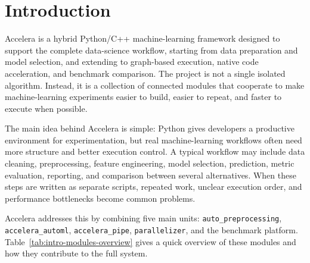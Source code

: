 \documentclass[12pt,a4paper]{report}
\begin{document}
\clearpage


\chapter{Introduction}
\label{chap:introduction}

Accelera is a hybrid Python/C++ machine-learning framework designed to support
the complete data-science workflow, starting from data preparation and model
selection, and extending to graph-based execution, native code acceleration, and
benchmark comparison. The project is not a single isolated algorithm. Instead,
it is a collection of connected modules that cooperate to make machine-learning
experiments easier to build, easier to repeat, and faster to execute when
possible.

The main idea behind Accelera is simple: Python gives developers a productive
environment for experimentation, but real machine-learning workflows often need
more structure and better execution control. A typical workflow may include data
cleaning, preprocessing, feature engineering, model selection, prediction,
metric evaluation, reporting, and comparison between several alternatives. When
these steps are written as separate scripts, repeated work, unclear execution
order, and performance bottlenecks become common problems.

Accelera addresses this by combining five main units:
\texttt{auto\_preprocessing}, \texttt{accelera\_automl},
\texttt{accelera\_pipe}, \texttt{parallelizer}, and the benchmark platform.
Table~\ref{tab:intro-modules-overview} gives a quick overview of these modules
and how they contribute to the full system.
\end{document}
